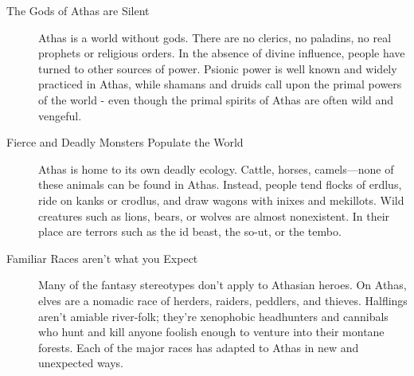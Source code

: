 \begin{description}
    \item [The Gods of Athas are Silent] Athas is a world without gods. There are no clerics, no paladins,
        no real prophets or religious orders. In the absence of divine influence, people have turned to
        other sources of power. Psionic power is well known and widely practiced in Athas, while shamans
        and druids call upon the primal powers of the world - even though the primal spirits of Athas are
        often wild and vengeful.

    \item [Fierce and Deadly Monsters Populate the World] Athas is home to its own deadly ecology. Cattle,
        horses, camels—none of these animals can be found in Athas. Instead, people tend flocks of erdlus,
        ride on kanks or crodlus, and draw wagons with inixes and mekillots. Wild creatures such as lions,
        bears, or wolves are almost nonexistent. In their place are terrors such as the id beast, the
        so-ut, or the tembo.

    \item [Familiar Races aren't what you Expect] Many of the fantasy stereotypes don’t apply to Athasian
        heroes. On Athas, elves are a nomadic race of herders, raiders, peddlers, and thieves. Halflings
        aren't amiable river-folk; they're xenophobic headhunters and cannibals who hunt and kill anyone
        foolish enough to venture into their montane forests. Each of the major races has adapted to Athas
        in new and unexpected ways.
\end{description}
